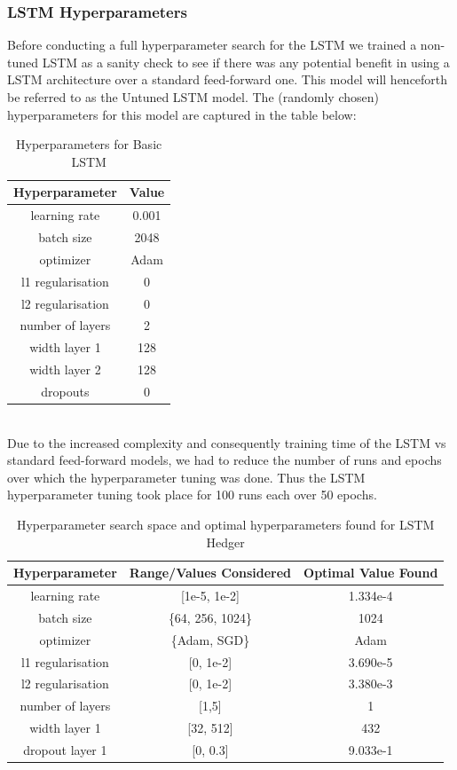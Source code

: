 \documentclass{article}
\theoremstyle{definition}
\begin{document}
\subsubsection{LSTM Hyperparameters}
Before conducting a full hyperparameter search for the LSTM we trained a non-tuned LSTM as a sanity check to see if there was any potential benefit in using a LSTM architecture over a standard feed-forward one. This model will henceforth be referred to as the Untuned LSTM model. The (randomly chosen) hyperparameters for this model are captured in the table below:
\begin{table}[h]
\centering
\begin{tabular}{|c|c|}
\hline
\textbf{Hyperparameter} & \textbf{Value}  \\
\hline
learning rate & 0.001\\
batch size & 2048\\
optimizer & Adam\\
l1 regularisation &0\\
l2 regularisation &0\\
number of layers & 2\\
width layer 1 & 128\\
width layer 2 & 128\\
dropouts &0\\
\hline
\end{tabular}
\caption{Hyperparameters for Basic LSTM}
\label{tab:hyperparams}
\end{table}\\
Due to the increased complexity and consequently training time of the LSTM vs standard feed-forward models, we had to reduce the number of runs and epochs over which the hyperparameter tuning was done. Thus the LSTM hyperparameter tuning took place for 100 runs each over 50 epochs.

\label{LSTM hyperparameters}
\begin{table}[h]
\centering
\begin{tabular}{|c|c|c|}
\hline
\textbf{Hyperparameter} & \textbf{Range/Values Considered} &\textbf{Optimal Value Found} \\
\hline
learning rate & [1e-5, 1e-2]& 1.334e-4\\
batch size & \{64, 256, 1024\}&1024\\
optimizer & \{Adam, SGD\} & Adam\\
l1 regularisation &[0, 1e-2]&3.690e-5\\
l2 regularisation &[0, 1e-2]& 3.380e-3\\
number of layers & [1,5] & 1\\
width layer 1 & [32, 512] &432\\
dropout layer 1 &[0, 0.3]&9.033e-1\\
\hline
\end{tabular}
\caption{Hyperparameter search space and optimal hyperparameters found for LSTM Hedger}
\label{tab:hyperparams}
\end{table}\\
\end{document}
